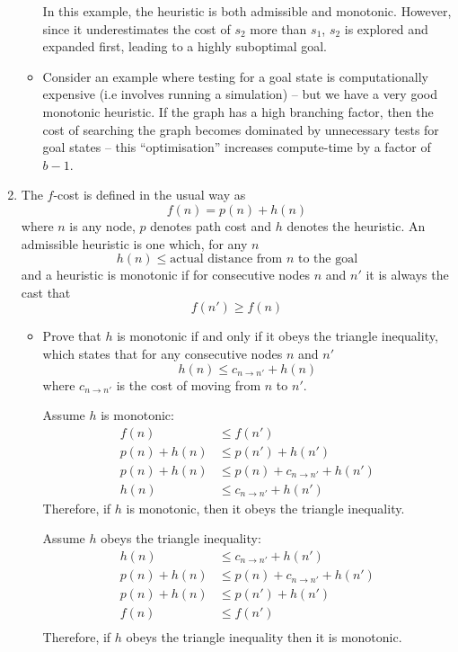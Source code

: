 \documentclass[10pt,\jkfside,a4paper]{article}
\begin{document}
\begin{enumerate}
\begin{itemize}
In this example, the heuristic is both admissible and monotonic. However,
since it underestimates the cost of $s_2$ more than $s_1$, $s_2$ is explored
and expanded first, leading to a highly suboptimal goal.

\item Consider an example where testing for a goal state is computationally
expensive (i.e involves running a simulation) -- but we have a very good
monotonic heuristic. If the graph has a high branching factor, then the
cost of searching the graph becomes dominated by unnecessary tests for goal
states -- this ``optimisation'' increases compute-time by a factor of $b-1$.

\end{itemize}

\item The $f$-cost is defined in the usual way as
\[
f(n) = p(n) + h(n)
\]
where $n$ is any node, $p$ denotes path cost and $h$ denotes the heuristic. 
An admissible heuristic is one which, for any $n$
\[
h(n) \le \text{actual distance from $n$ to the goal}
\]
and a heuristic is monotonic if for consecutive nodes $n$ and $n'$ it is 
always the cast that
\[
f(n') \ge f(n)
\]
\begin{itemize}

\item Prove that $h$ is monotonic if and only if it obeys the triangle 
inequality, which states that for any consecutive nodes $n$ and $n'$
\[
h(n) \le c_{n \to n'} + h(n)
\]
where $c_{n \to n'}$ is the cost of moving from $n$ to $n'$.

Assume $h$ is monotonic:
\[
\begin{split}
f(n) &\le f(n') \\
p(n) + h(n) &\le p(n') + h(n') \\
p(n) + h(n) &\le p(n) + c_{n \to n'} + h(n') \\
h(n) &\le c_{n \to n'} + h(n')
\end{split}
\]
Therefore, if $h$ is monotonic, then it obeys the triangle inequality.

Assume $h$ obeys the triangle inequality:
\[
\begin{split}
h(n) &\le c_{n \to n'} + h(n') \\
p(n) + h(n) &\le p(n) + c_{n \to n'} + h(n') \\
p(n) + h(n) &\le p(n') + h(n') \\
f(n) &\le f(n') \\
\end{split}
\]
Therefore, if $h$ obeys the triangle inequality then it is monotonic.


\end{itemize}
\end{enumerate}
\end{document}
